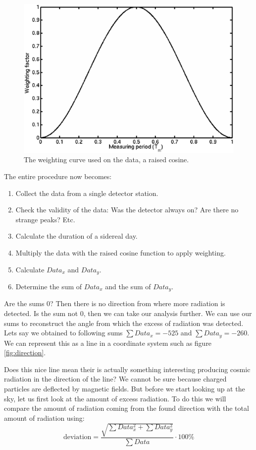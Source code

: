 \documentclass[12pt,a4paper]{article}
\numberwithin{equation}{section}
\numberwithin{figure}{section}
\numberwithin{table}{section}
\begin{document}
\begin{figure}\begin{center}
\includegraphics[scale=0.5]{raised_cosine.eps}
\caption{The weighting curve used on the data, a raised cosine.}\label{fig:raised_cosine}
\end{center}\end{figure} 

The entire procedure now becomes:
\begin{enumerate}[1.]
\item Collect the data from a single detector station.
\item Check the validity of the data: Was the detector always on? Are there no strange peaks? Etc.
\item Calculate the duration of a sidereal day.
\item Multiply the data with the raised cosine function to apply weighting.
\item Calculate $Data_x$ and $Data_y$.
\item Determine the sum of $Data_x$ and the sum of $Data_y$.
\end{enumerate}
Are the sums 0? Then there is no direction from where more radiation is detected. Is the sum not 0, then we can take our analysis further. We can use our sums to reconstruct the angle from which the excess of radiation was detected. Lets say we obtained to following sums $\sum Data_x = -525$  and $\sum Data_y = -260$. We can represent this as a line in a coordinate system such as figure \ref{fig:direction}. 

Does this nice line mean their is actually something interesting producing cosmic radiation in the direction of the line? We cannot be sure because charged particles are deflected by magnetic fields. But before we start looking up at the sky, let us first look at the amount of excess radiation. To do this we will compare the amount of radiation coming from the found direction with the total amount of radiation using:
\begin{equation} \mbox{deviation} = \frac{\sqrt{\sum Data_x^2 + \sum Data_y ^2}}{\sum Data} \cdot 100\% \end{equation}
\end{document}
